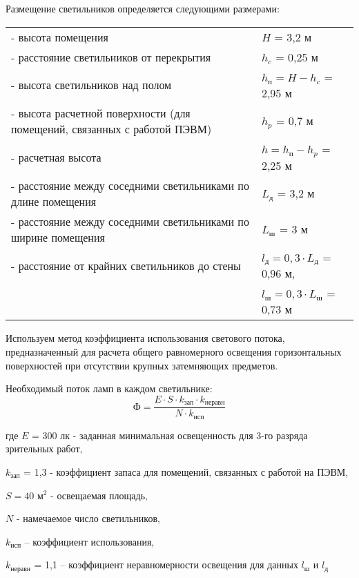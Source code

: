 Размещение светильников определяется следующими размерами:

\begin{tabular}{ll}
    - высота помещения                                                      & $H$ = 3,2 м \\
    - расстояние светильников от перекрытия                                 & $h_c$ = 0,25 м \\
    - высота светильников над полом                                         & $h_\text{п} = H - h_c$ = 2,95 м \\
    - высота расчетной поверхности (для помещений, связанных с работой ПЭВМ)& $h_p$ = 0,7 м \\
    - расчетная высота                                                      & $h = h_\text{п} - h_p$ = 2,25 м \\
    - расстояние между соседними светильниками по длине помещения           & $L_\text{д}$ = 3,2 м \\
    - расстояние между соседними светильниками по ширине помещения          & $L_\text{ш}$ = 3 м \\
    - расстояние от крайних светильников до стены                           & $l_\text{д} = 0,3 \cdot L_\text{д}$ = 0,96 м, \\
    & $l_\text{ш} = 0,3 \cdot L_\text{ш}$ = 0,73 м \\
\end{tabular}

Используем метод коэффициента использования светового потока, предназначенный для
расчета общего равномерного освещения горизонтальных поверхностей при отсутствии
крупных затемняющих предметов.

Необходимый поток ламп в каждом светильнике:
\begin{equation}
\label{one_lamp_stream}
    \text{Ф} = \frac{E \cdot S \cdot k_\text{зап} \cdot k_\text{неравн}}{N \cdot k_\text{исп}}
\end{equation}

где $E$ = 300 лк - заданная минимальная освещенность для 3-го разряда зрительных работ,

$k_\text{зап}$ = 1,3 - коэффициент запаса для помещений, связанных с работой на ПЭВМ,

$S = 40 \text{ м}^2$ - освещаемая площадь,

$N$ - намечаемое число светильников,

$k_\text{исп}$ – коэффициент использования,

$k_\text{неравн}$ = 1,1 – коэффициент неравномерности освещения для данных $l_\text{ш}$ и
$l_\text{д}$

